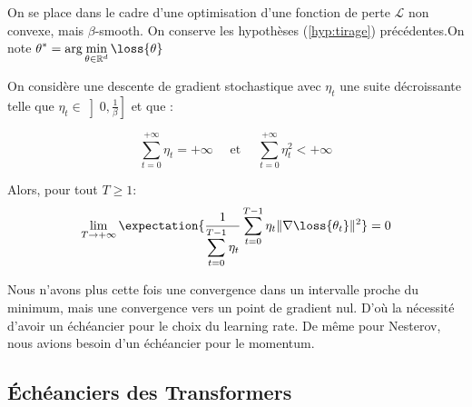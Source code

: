 \documentclass{beamer}
\begin{document}
\begin{frame}{}{}
	On se place dans le cadre d'une optimisation d'une fonction de perte $\mathcal{L}$ non convexe, mais $\beta$-smooth. On conserve les hypothèses (\ref{hyp:tirage}) précédentes.On note $\displaystyle \theta^* = \arg \min_{\theta\in \mathbb{R}^d}\loss{\theta}$
	
	\begin{theoreme}
		On considère une descente de gradient stochastique avec $\eta_t$ une suite décroissante telle que $\displaystyle \eta_t\in \left]0, \frac{1}{\beta}\right]$ et que : 
		
		\begin{equation*}
			\sum_{t=0}^{+\infty} \eta_t=+\infty \quad \text{ et } \quad \sum_{t=0}^{+\infty} \eta_t^2<+\infty
		\end{equation*}
		
		Alors, pour tout $T \geqslant 1$:
		\begin{equation*}
			\lim_{T\rightarrow +\infty} \expectation{\frac{1}{\displaystyle \sum_{t=0}^{T-1}\eta_t}\sum_{t=0}^{T-1} \eta_t\|\nabla\loss{\theta_t}\|^2} = 0 
		\end{equation*}
	\end{theoreme}
	
	Nous n'avons plus cette fois une convergence dans un intervalle proche du minimum, mais une convergence vers un point de gradient nul. D'où la nécessité d'avoir un échéancier pour le choix du learning rate. De même pour Nesterov, nous avions besoin d'un échéancier pour le momentum.
\end{frame}







\subsection{Échéanciers des Transformers}
\end{document}

